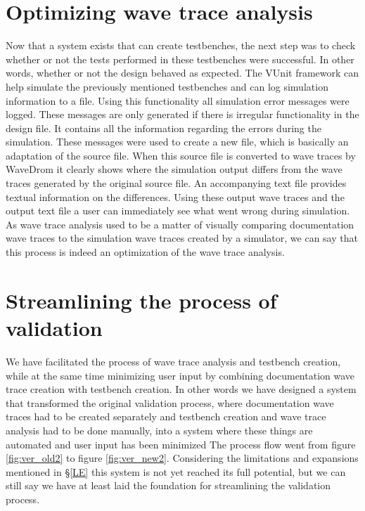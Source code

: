 \section{Optimizing wave trace analysis}
Now that a system exists that can create testbenches, the next step was to check whether or not the tests performed in these testbenches were successful. In other words, whether or not the design behaved as expected.
\npar
The VUnit framework can help simulate the previously mentioned testbenches and can log simulation information to a file. Using this functionality all simulation error messages were logged. These messages are only generated if there is irregular functionality in the design file. It contains all the information regarding the errors during the simulation. These messages were used to create a new file, which is basically an adaptation of the source file. When this source file is converted to wave traces by WaveDrom it clearly shows where the simulation output differs from the wave traces generated by the original source file. An accompanying text file provides textual information on the differences. Using these output wave traces and the output text file a user can immediately see what went wrong during simulation.
\npar
As wave trace analysis used to be a matter of visually comparing documentation wave traces to the simulation wave traces created by a simulator, we can say that this process is indeed an optimization of the wave trace analysis.
\section{Streamlining the process of validation}
We have facilitated the process of wave trace analysis and testbench creation, while at the same time minimizing user input by combining documentation wave trace creation with testbench creation. In other words we have designed a system that transformed the original validation process, where documentation wave traces had to be created separately and testbench creation and wave trace analysis had to be done manually, into a system where these things are automated and user input has been minimized The process flow went from figure \ref{fig:ver_old2} to figure \ref{fig:ver_new2}.
\npar
Considering the limitations and expansions mentioned in §\ref{LE} this system is not yet reached its full potential, but we can still say we have at least laid the foundation for streamlining the validation process.%
%
\npar
{}%
\newpage
